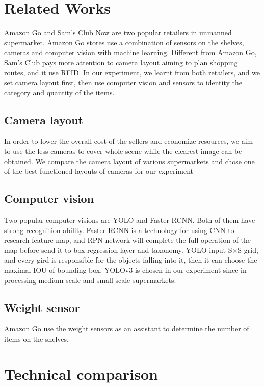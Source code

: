 \section{Related Works}
\label{sec:rw}

Amazon Go and Sam's Club Now are two popular retailers in unmanned supermarket.
Amazon Go stores use a combination of sensors on the shelves, cameras and computer vision with machine learning.
Different from Amazon Go, Sam's Club  pays more attention to camera layout aiming to plan shopping routes, and it use RFID\cite{1192765}.
In our experiment, we learnt from both retailers, and we set camera layout first, then use computer vision and sensors to identity the category and quantity of the items.

\subsection{Camera layout}

In order to lower the overall cost of the sellers and economize resources, we aim to use the less cameras to cover whole scene while  the clearest image can be obtained.
We compare the camera layout of various supermarkets and chose one of the best-functioned layouts of cameras for our experiment


\subsection{Computer vision}
Two popular computer visions are YOLO and Faster-RCNN\cite{NIPS2015_5638}\cite{yolov3}.
Both of them have strong recognition ability. Faster-RCNN is a technology for using CNN to research feature map, and RPN network will complete the full operation of the map before send it to box regression layer and taxonomy\cite{NIPS2015_5638}.
YOLO input S×S grid, and every gird is responsible for the objects falling into it, then it can choose the maximal IOU of bounding box\cite{yolov3}.
YOLOv3 is chosen in our experiment since in processing medium-scale and small-scale supermarkets.

\subsection{Weight sensor}
Amazon Go use the weight sensors as an assistant to determine the number of items on the shelves.

\section{ Technical comparison }

